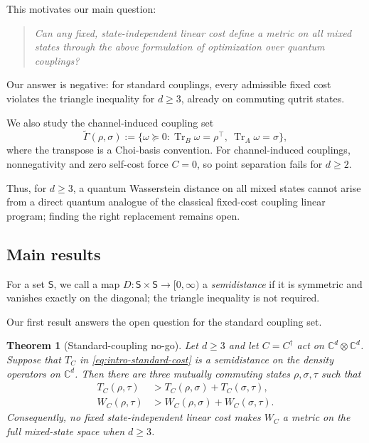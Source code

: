 \documentclass[11pt]{article}
\newtheorem{theorem}{Theorem}[section]
\begin{document}
\begin{samepage}
This motivates our main question:
\begin{quote}
\emph{Can any fixed, state-independent
linear cost define a metric on all mixed states through the above formulation of
optimization over quantum couplings?}
\end{quote}
\end{samepage}

Our answer is negative: for standard couplings, every admissible fixed cost
violates the triangle inequality for $d\geq3$, already on commuting qutrit
states.

We also study the channel-induced coupling set
\begin{equation}\label{eq:intro-channel-couplings}
    \widetilde{\Gamma}(\rho,\sigma)
    :=
    \{\omega\succeq0:
      \operatorname{Tr}_B\omega=\rho^\top,\
      \operatorname{Tr}_A\omega=\sigma\},
\end{equation}
where the transpose is a Choi-basis convention.
For channel-induced couplings, nonnegativity and zero self-cost
force $C=0$, so point separation fails for $d\geq2$.

Thus, for $d\geq3$, a quantum Wasserstein distance on all mixed states
cannot arise from a direct quantum analogue of the classical fixed-cost
coupling linear program; finding the right replacement remains open.

\subsection{Main results}

For a set $\mathsf{S}$, we call a map
$D:\mathsf{S}\times\mathsf{S}\to[0,\infty)$ a \emph{semidistance} if
it is symmetric and vanishes exactly on the diagonal; the triangle
inequality is not required.

Our first result answers the open question for the standard coupling
set.

\begin{theorem}[Standard-coupling no-go]\label{thm:intro-standard-no-go}
    Let $d\geq 3$ and let $C=C^\dagger$ act on
    $\mathbb{C}^d\otimes\mathbb{C}^d$.  Suppose that $T_C$ in
    \eqref{eq:intro-standard-cost} is a semidistance on the density operators
    on $\mathbb{C}^d$.  Then there are three mutually commuting states
    $\rho,\sigma,\tau$ such that
    \begin{align}
        T_C(\rho,\tau)
        &>
        T_C(\rho,\sigma)+T_C(\sigma,\tau),\label{eq:intro-T-violation}\\
        W_C(\rho,\tau)
        &>
        W_C(\rho,\sigma)+W_C(\sigma,\tau).
        \label{eq:intro-W-violation}
    \end{align}
    Consequently, no fixed state-independent linear cost makes $W_C$ a
    metric on the full mixed-state space when $d\geq 3$.
\end{theorem}
\end{document}
